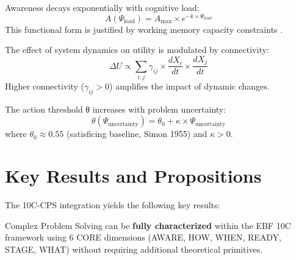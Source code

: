 \begin{tcolorbox}[colback=red!5!white, colframe=red!75!black,
    title=Axiom CPS-3: Awareness-Load Decay]
Awareness decays exponentially with cognitive load:
\begin{equation}
A(\Psi_{\text{load}}) = A_{\max} \times e^{-k \times \Psi_{\text{load}}}
\end{equation}
This functional form is justified by working memory capacity constraints \citep{sweller1988cognitiveload}.
\end{tcolorbox}

\begin{tcolorbox}[colback=red!5!white, colframe=red!75!black,
    title=Axiom CPS-4: Connectivity Interaction]
The effect of system dynamics on utility is modulated by connectivity:
\begin{equation}
\Delta U \propto \sum_{i,j} \gamma_{ij} \times \frac{dX_i}{dt} \times \frac{dX_j}{dt}
\end{equation}
Higher connectivity ($\gamma_{ij} > 0$) amplifies the impact of dynamic changes.
\end{tcolorbox}

\begin{tcolorbox}[colback=red!5!white, colframe=red!75!black,
    title=Axiom CPS-5: Threshold Elevation Under Uncertainty]
The action threshold θ increases with problem uncertainty:
\begin{equation}
\theta(\Psi_{\text{uncertainty}}) = \theta_0 + \kappa \times \Psi_{\text{uncertainty}}
\end{equation}
where $\theta_0 \approx 0.55$ (satisficing baseline, Simon 1955) and $\kappa > 0$.
\end{tcolorbox}



\section{Key Results and Propositions}
\label{sec:cps-results}

The 10C-CPS integration yields the following key results:

\begin{tcolorbox}[colback=blue!5!white, colframe=blue!75!black,
    title=Proposition CPS-R1: Configuration Sufficiency]
Complex Problem Solving can be \textbf{fully characterized} within the EBF 10C framework using 6 CORE dimensions (AWARE, HOW, WHEN, READY, STAGE, WHAT) without requiring additional theoretical primitives.
\end{tcolorbox}


